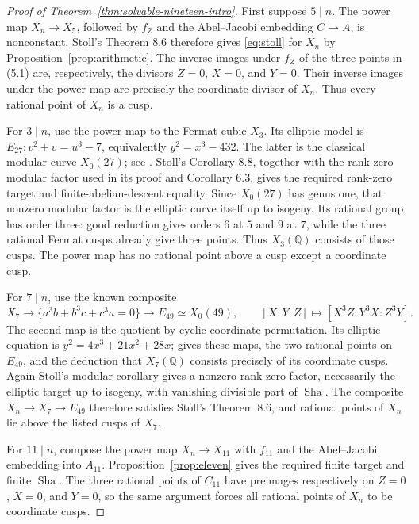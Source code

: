 \documentclass[11pt]{article}
\newcommand{\Q}{\mathbb Q}
\newcommand{\Sha}{\operatorname{Sha}}
\theoremstyle{definition}
\begin{document}
\begin{proof}[Proof of Theorem~\ref{thm:solvable-nineteen-intro}]
First suppose $5\mid n$. The power map $X_n\to X_5$, followed by $f_Z$ and the Abel--Jacobi
embedding $C\to A$, is nonconstant. Stoll's Theorem 8.6 therefore gives
\eqref{eq:stoll} for $X_n$ by Proposition~\ref{prop:arithmetic}.
The inverse images under $f_Z$ of the three points in (5.1) are,
respectively, the divisors $Z=0$, $X=0$, and $Y=0$. Their inverse
images under the power map are precisely the coordinate divisor of
$X_n$. Thus every rational point of $X_n$ is a cusp.

For $3\mid n$, use the power map to the Fermat cubic $X_3$. Its
elliptic model is $E_{27}:v^2+v=u^3-7$, equivalently
$y^2=x^3-432$. The latter is the classical modular curve $X_0(27)$;
see \citet[\S10.1]{KrizLi2019}. Stoll's Corollary 8.8, together with
the rank-zero modular factor used in its proof and Corollary 6.3,
gives the required rank-zero target and finite-abelian-descent
equality. Since $X_0(27)$ has genus one, that nonzero modular factor
is the elliptic curve itself up to isogeny. Its rational group has
order three: good reduction gives orders $6$ at $5$ and $9$ at $7$,
while the three rational Fermat cusps already give three points.
Thus $X_3(\Q)$ consists of those cusps. The power map has no rational
point above a cusp except a coordinate cusp.

For $7\mid n$, use the known composite
\[
X_7\longrightarrow
\{a^3b+b^3c+c^3a=0\}\longrightarrow E_{49}\simeq X_0(49),
\qquad
[X:Y:Z]\longmapsto[X^3Z:Y^3X:Z^3Y].
\]
The second map is the quotient by cyclic coordinate permutation.
Its elliptic equation is $y^2=4x^3+21x^2+28x$;
\citet[\S2, equation (2.10), pp.~68--69; \S3.1--3.2, pp.~72--74]{Elkies1998}
gives these maps, the two rational points on $E_{49}$, and the
deduction that $X_7(\Q)$ consists precisely of its coordinate cusps.
Again Stoll's modular corollary gives a nonzero rank-zero factor,
necessarily the elliptic target up to isogeny, with vanishing
divisible part of $\Sha$. The composite $X_n\to X_7\to E_{49}$
therefore satisfies Stoll's Theorem 8.6, and rational points of
$X_n$ lie above the listed cusps of $X_7$.

For $11\mid n$, compose the power map $X_n\to X_{11}$ with
$f_{11}$ and the Abel--Jacobi embedding into $A_{11}$.
Proposition~\ref{prop:eleven} gives the required finite target and
finite $\Sha$. The three rational points of $C_{11}$ have preimages
respectively on $Z=0$, $X=0$, and $Y=0$, so the same argument forces
all rational points of $X_n$ to be coordinate cusps.


\end{proof}
\end{document}
